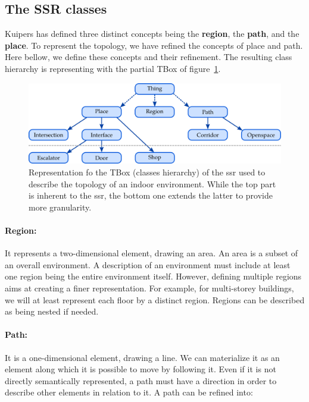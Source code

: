 \subsection{The SSR classes}

Kuipers has defined three distinct concepts being the \textbf{region}, the \textbf{path}, and the \textbf{place}. To represent the topology, we have refined the concepts of place and path. Here bellow, we define these concepts and their refinement. The resulting class hierarchy is representing with the partial TBox of figure~\ref{fig:chap3_tbox}.

\begin{figure}[ht!]
\centering
\includegraphics[scale=0.4]{figures/chapter3/ssr_tbox.png}
\caption{\label{fig:chap3_tbox} Representation fo the TBox (classes hierarchy) of the \acrlong{ssr} used to describe the topology of an indoor environment. While the top part is inherent to the \acrshort{ssr}, the bottom one extends the latter to provide more granularity.}
\end{figure}

\paragraph{Region:} It represents a two-dimensional element, drawing an area. An area is a subset of an overall environment. A description of an environment must include at least one region being the entire environment itself. However, defining multiple regions aims at creating a finer representation. For example, for multi-storey buildings, we will at least represent each floor by a distinct region. Regions can be described as being nested if needed.

\paragraph{Path:} It is a one-dimensional element, drawing a line. We can materialize it as an element along which it is possible to move by following it. Even if it is not directly semantically represented, a path must have a direction in order to describe other elements in relation to it. A path can be refined into:

